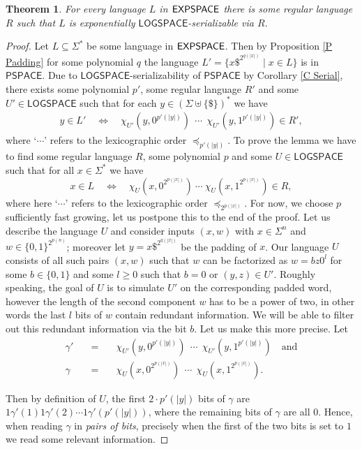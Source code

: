 \documentclass[times,envcountsame]{llncs}
\newtheorem{theorem}{{\bf Theorem}}[section]
\def\PSPACE{{\mathsf{PSPACE}}}
\renewcommand{\L}{\mathsf{LOGSPACE}}
\begin{document}
\begin{theorem}\label{T succ seri}
For every language $L$ in ${\mathsf{EXPSPACE}}$ there is some regular language $R$ such
that $L$ is exponentially $\L$-serializable via $R$.
\end{theorem}
\begin{proof}
Let $L\subseteq\Sigma^*$ be some language in ${\mathsf{EXPSPACE}}$.
Then by Proposition \ref{P Padding} for some polynomial $q$ the language
$L'=\{x\$^{2^{q(|x|)}}\mid x\in L\}$ is in $\PSPACE$.
Due to $\L$-serializability of $\PSPACE$ by Corollary \ref{C Serial}, there exists
some polynomial $p'$, some regular language $R'$ and some $U'\in\L$
 such that for each $y\in(\Sigma\uplus\{\$\})^*$ we have
\begin{eqnarray}
y\in L'\quad\iff\quad \chi_{U'}\left(y,0^{p'(|y|)}\right)\ \ \cdots\ \
\chi_{U'}\left(y,1^{p'(|y|)}\right)\in R', \label{E Serial}
\end{eqnarray}
where `$\cdots$' refers to the lexicographic order $\preceq_{p'(|y|)}$.
To prove the lemma we have to find some regular language $R$, some
polynomial $p$ and some $U\in\L$
such that for all $x\in\Sigma^*$ we have
$$
x\in L\quad \iff\quad \chi_U\left(x,0^{2^{p(|x|)}}\right)\ \cdots\
\chi_U\left(x,1^{2^{p(|x|)}}\right)\in R,
$$
where here `$\cdots$' refers to the lexicographic order
$\preceq_{2^{p(|x|)}}$.
For now, we choose $p$ sufficiently fast growing,
let us postpone this to the end of the proof.
Let us describe the language $U$ and consider inputs $(x,w)$
 with $x\in\Sigma^n$ and $w\in\{0,1\}^{2^{p(n)}}$;
moreover let $y=x\$^{2^{q(|x|)}}$ be the padding of $x$.
Our language $U$ consists of all such pairs $(x,w)$
such that
$w$ can be factorized as $w=bz0^l$ for some $b\in\{0,1\}$
and some $l\geq 0$ such that
$b=0$ or $(y,z)\in U'$.
Roughly speaking, the goal of $U$ is to simulate $U'$
on the corresponding padded word,
however the length of the second component
$w$ has to be a power of two, in other words the last $l$ bits of $w$
 contain redundant information.
We will be able to filter out this redundant information via
the bit $b$.
Let us make this more precise.
Let
\begin{eqnarray*}
\gamma' &\quad=\quad&
\chi_{U'}\left(y,0^{p'(|y|)}\right)\ \ \cdots\ \
\chi_{U'}\left(y,1^{p'(|y|)}\right)\quad\text{and}\\
\gamma &\quad=\quad& \chi_U\left(x,0^{2^{p(|x|)}}\right)\ \ \cdots\ \
\chi_U\left(x,1^{2^{p(|x|)}}\right).
\end{eqnarray*}

\noindent
Then by definition of $U$, the first $2\cdot p'(|y|)$ bits of $\gamma$ are
$1\gamma'(1)1\gamma'(2)\cdots 1\gamma'(p'(|y|))$, where
the remaining bits of $\gamma$ are all $0$.
Hence, when reading $\gamma$ in {\em pairs of bits},
precisely when the first of the two bits
is set to $1$ we read some relevant information.


\end{proof}
\end{document}

